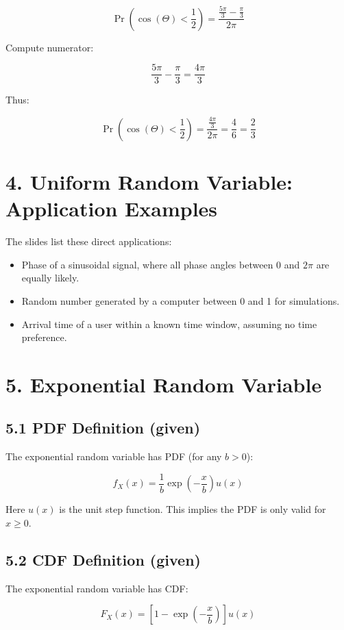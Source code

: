 \documentclass{article}
\begin{document}
\[
\Pr\left(\cos(\Theta)<\frac{1}{2}\right)=\frac{\frac{5\pi}{3}-\frac{\pi}{3}}{2\pi}
\]

Compute numerator:

\[
\frac{5\pi}{3}-\frac{\pi}{3}=\frac{4\pi}{3}
\]

Thus:

\[
\Pr\left(\cos(\Theta)<\frac{1}{2}\right)=\frac{\frac{4\pi}{3}}{2\pi}=\frac{4}{6}=\frac{2}{3}
\]


\section*{4. Uniform Random Variable: Application Examples}
The slides list these direct applications:

\begin{itemize}
    \item Phase of a sinusoidal signal, where all phase angles between $0$ and $2\pi$ are equally likely.
    \item Random number generated by a computer between 0 and 1 for simulations.
    \item Arrival time of a user within a known time window, assuming no time preference.
\end{itemize}


\section*{5. Exponential Random Variable}

\subsection*{5.1 PDF Definition (given)}
The exponential random variable has PDF (for any $b>0$):

\[
f_X(x)=\frac{1}{b}\exp\left(-\frac{x}{b}\right)u(x)
\]

\noindent Here $u(x)$ is the unit step function.  
This implies the PDF is only valid for $x\ge 0$.

\subsection*{5.2 CDF Definition (given)}
The exponential random variable has CDF:

\[
F_X(x)=\left[1-\exp\left(-\frac{x}{b}\right)\right]u(x)
\]
\end{document}
